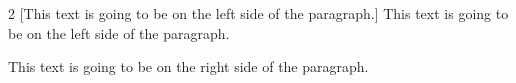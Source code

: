 
\begin{multicols}{2} [This text is going to be on the left side of the paragraph.]
	This text is going to be on the left side of the paragraph.

	\columnbreak

	This text is going to be on the right side of the paragraph.
\end{multicols}
